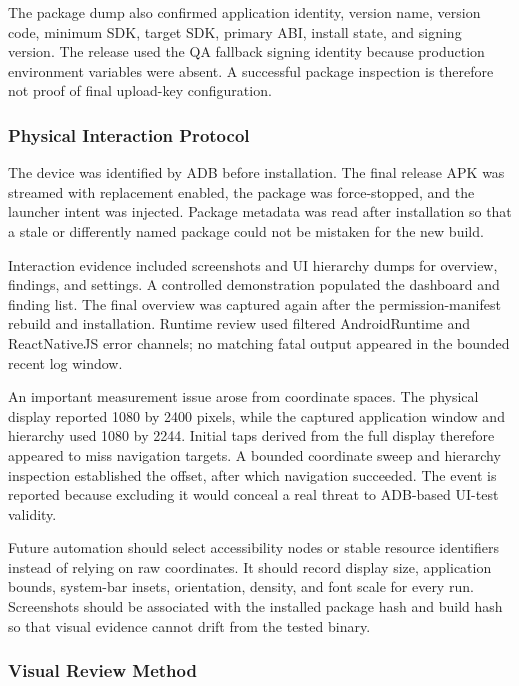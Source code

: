 The package dump also confirmed application identity, version name, version code, minimum SDK, target SDK, primary ABI, install state, and signing version. The release used the QA fallback signing identity because production environment variables were absent. A successful package inspection is therefore not proof of final upload-key configuration.

\subsubsection{Physical Interaction Protocol}

The device was identified by ADB before installation. The final release APK was streamed with replacement enabled, the package was force-stopped, and the launcher intent was injected. Package metadata was read after installation so that a stale or differently named package could not be mistaken for the new build.

Interaction evidence included screenshots and UI hierarchy dumps for overview, findings, and settings. A controlled demonstration populated the dashboard and finding list. The final overview was captured again after the permission-manifest rebuild and installation. Runtime review used filtered AndroidRuntime and ReactNativeJS error channels; no matching fatal output appeared in the bounded recent log window.

An important measurement issue arose from coordinate spaces. The physical display reported 1080 by 2400 pixels, while the captured application window and hierarchy used 1080 by 2244. Initial taps derived from the full display therefore appeared to miss navigation targets. A bounded coordinate sweep and hierarchy inspection established the offset, after which navigation succeeded. The event is reported because excluding it would conceal a real threat to ADB-based UI-test validity.

Future automation should select accessibility nodes or stable resource identifiers instead of relying on raw coordinates. It should record display size, application bounds, system-bar insets, orientation, density, and font scale for every run. Screenshots should be associated with the installed package hash and build hash so that visual evidence cannot drift from the tested binary.

\subsubsection{Visual Review Method}

